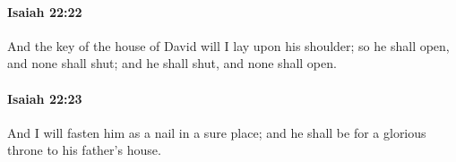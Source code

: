 		\paragraph{Isaiah 22:22} %
			\label{ISAIAH-22-22}

			And the key of the house of David will I lay upon his shoulder; so he shall open, and none shall shut; and he shall shut, and none shall open.


		\paragraph{Isaiah 22:23} %
			\label{ISAIAH-22-23}

			And I will fasten him as a nail in a sure place; and he shall be for a glorious throne to his father's house.


